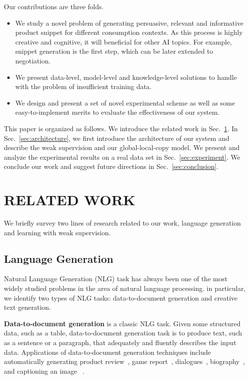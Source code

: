 \documentclass[sigconf]{acmart}
\begin{document}

Our contributions are three folds.
\begin{itemize}
\item We study a novel problem of generating persuasive, relevant and informative product snippet for different consumption contexts. As this process is highly creative and cognitive, it will beneficial for other AI topics. For example, snippet generation is the first step, which can be later extended to negotiation.
\item We present data-level, model-level and knowledge-level solutions to handle with the problem of insufficient training data.
\item We design and present a set of novel experimental scheme as well as some easy-to-implement merits to evaluate the effectiveness of our system. 
\end{itemize}


This paper is organized as follows. We introduce the related work in Sec.~\ref{sec:related}. In Sec.~\ref{sec:architecture}, we first introduce the architecture of our system and describe the weak supervision and our global-local-copy model. We present and analyze the experimental results on a real data set in Sec.~\ref{sec:experiment}. We conclude our work and suggest future directions in Sec.~\ref{sec:conclusion}.

\section{RELATED WORK}\label{sec:related}
We briefly survey two lines of research related to our work, language generation and learning with weak supervision.

\subsection{Language Generation}
Natural Language Generation (NLG) task has always been one of the most widely studied problems in the area of natural language processing. in particular,  we identify two types of NLG tasks: data-to-document generation and creative text generation.

\textbf{Data-to-document generation} is a classic NLG task. Given some structured data, such as a table, data-to-document generation task is to produce text, such as a sentence or a paragraph, that adequately and fluently describes the input data. Applications of data-to-document generation techniques include automatically generating product review~\cite{dong2017learning,Costa2018Automatic}, game report~\cite{Wiseman2017Challenges}, dialogues~\cite{Yang2017Reference}, biography~\cite{Lebret2016Neural}, and captioning an image ~\cite{Karpathy2015Deep}.
\end{document}

